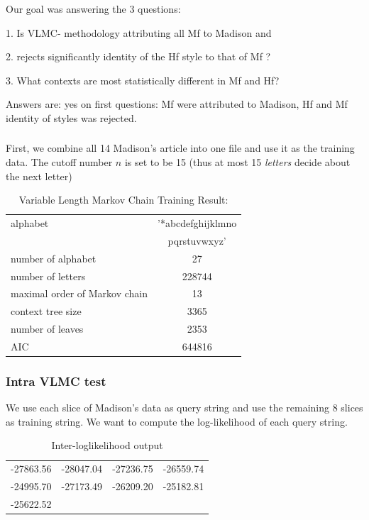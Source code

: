 \documentclass{beamer}
\begin{document}
\begin{frame}
\frametitle{}
 Our goal
was answering the 3 questions:

1. Is VLMC- methodology
 attributing all Mf to Madison and 

2.  rejects significantly identity of the Hf style
 to that of Mf ?

 3. What contexts are most statistically different in Mf and Hf?

 Answers are: yes on first questions: Mf  were
attributed to Madison,  Hf and Mf identity of styles was rejected.


\end{frame}
\begin{frame}
\frametitle{}
First, we combine all 14 Madison's article into one file and use it as the
training data. The cutoff number $n$ is set to be 15 (thus at most
15 {\it letters} decide about the next letter)\


\begin{table}[h!]
\caption{Variable Length Markov Chain Training Result:} 
\centering
\begin{tabular}{ l | c  }
    \hline

    alphabet  & '*abcdefghijklmno\\
&pqrstuvwxyz' \\ \hline
    number of alphabet &  27 \\ \hline
    number of letters &  228744 \\ \hline
    maximal order of Markov chain & 13 \\ \hline
    context tree size & 3365 \\ \hline
    number of leaves & 2353\\ \hline
    AIC & 644816 \\ \hline
  \end{tabular}
\end{table}


\end{frame}
\begin{frame}
\frametitle{Intra VLMC test}
 We use each slice of Madison's data as query
string and use the remaining 8 slices as training string. We want to
compute the log-likelihood of each query string.\\

\begin{table}[h!]
\caption{Inter-loglikelihood output} %
\centering
\begin{tabular}{c c c c} %
\hline %
-27863.56 &-28047.04 &-27236.75 &-26559.74 \\
-24995.70 &-27173.49& -26209.20 &-25182.81 \\
-25622.52\\
\hline %
\end{tabular}
\end{table}


\end{frame}
\end{document}
